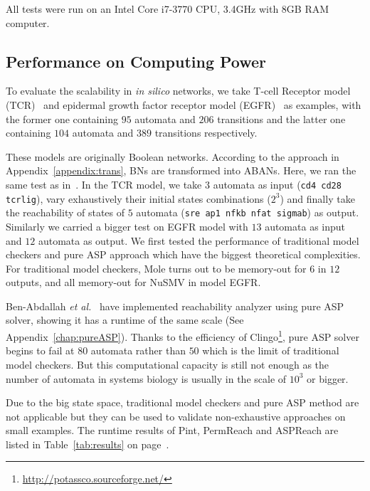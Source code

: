 All tests were run on an Intel Core i7-3770 CPU, \@3.4GHz with 8GB RAM computer.

\subsection{Performance on Computing Power}
To evaluate the scalability in \textit{in silico} networks, we take T-cell Receptor model (TCR)~\cite{saez2007logical} and epidermal growth factor receptor model (EGFR)~\cite{samaga2009logic} as examples, with the former one containing $95$ automata and $206$ transitions and the latter one containing $104$ automata and $389$ transitions respectively. 

These models are originally Boolean networks.
According to the approach in Appendix~\ref{appendix:trans}, BNs are transformed into ABANs. 
Here, we ran the same test as in~\cite{folschette2015}. In the TCR model, we take $3$ automata as input (\texttt{cd4 cd28 tcrlig}), vary exhaustively their initial states combinations ($2^3$) and finally take the reachability of states of $5$ automata (\texttt{sre ap1 nfkb nfat sigmab}) as output. 
Similarly we carried a bigger test on EGFR model with $13$ automata %
as input and $12$ automata %
as output.
We first tested the performance of traditional model checkers and pure ASP approach which have the biggest theoretical complexities. 
For traditional model checkers, Mole turns out to be memory-out for $6$ in $12$ outputs, and all memory-out for NuSMV in model EGFR. 

Ben-Abdallah \textit{et al.}~\cite{abdallah2015exhaustive} have implemented reachability analyzer using pure ASP solver, showing it has a runtime of the same scale (See Appendix~\ref{chap:pureASP}).
Thanks to the efficiency of Clingo\footnote{\url{http://potassco.sourceforge.net/}}, pure ASP solver begins to fail at $80$ automata rather than $50$ which is the limit of traditional model checkers. 
But this computational capacity is still not enough as the number of automata in systems biology is usually in the scale of $10^3$ or bigger.

Due to the big state space, traditional model checkers and pure ASP method are not applicable but they can be used to validate non-exhaustive approaches on small examples.
The runtime results of Pint, PermReach and ASPReach are listed in Table~\ref{tab:results} on page~\pageref{tab:results}.

